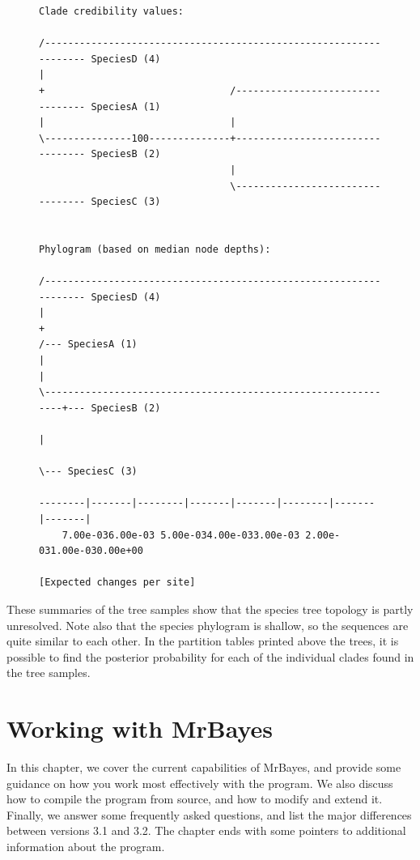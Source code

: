 \documentclass[12pt]{book}
\begin{document}
\begin{figure}[h]
\centering
\begin{BVerbatim}[fontsize=\scriptsize]
Clade credibility values:

/------------------------------------------------------------------ SpeciesD (4)
|
+                                /--------------------------------- SpeciesA (1)
|                                |
\---------------100--------------+--------------------------------- SpeciesB (2)
                                 |
                                 \--------------------------------- SpeciesC (3)


Phylogram (based on median node depths):

/------------------------------------------------------------------ SpeciesD (4)
|
+                                                              /--- SpeciesA (1)
|                                                              |
\--------------------------------------------------------------+--- SpeciesB (2)
                                                               |
                                                               \--- SpeciesC (3)

--------|-------|--------|-------|-------|--------|-------|-------|
    7.00e-036.00e-03 5.00e-034.00e-033.00e-03 2.00e-031.00e-030.00e+00

[Expected changes per site]

\end{BVerbatim}
\end{figure}

These summaries of the tree samples show that the species tree topology is partly unresolved. Note
also that the species phylogram is shallow, so the sequences are quite similar to each other. In
the partition tables printed above the trees, it is possible to find the posterior probability for
each of the individual clades found in the tree samples.

\chapter{Working with MrBayes}\label{advancedTopics}

In this chapter, we cover the current capabilities of MrBayes, and provide some guidance on how you
work most effectively with the program. We also discuss how to compile the program from source, and
how to modify and extend it. Finally, we answer some frequently asked questions, and list the major
differences between versions 3.1 and 3.2. The chapter ends with some pointers to additional
information about the program.
\end{document}
